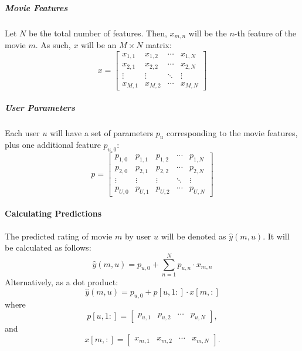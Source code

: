 \documentclass[a3paper,12pt]{article}
\begin{document}
\subparagraph{Movie Features}
Let \( N \) be the total number of features. Then, \( x_{m,n} \) will be the \( n \)-th feature of the movie \( m \). As such, \( x \) will be an \( M \times N \) matrix:
\begin{equation}
x =
\begin{bmatrix}
x_{1,1} & x_{1,2} & \cdots & x_{1,N} \\
x_{2,1} & x_{2,2} & \cdots & x_{2,N} \\
\vdots & \vdots & \ddots & \vdots \\
x_{M,1} & x_{M,2} & \cdots & x_{M,N}
\end{bmatrix} \tag{5}
\end{equation}

\subparagraph{User Parameters}
Each user \( u \) will have a set of parameters \( p_u \) corresponding to the movie features, plus one additional feature \( p_{u,0} \):
\begin{equation}
p =
\begin{bmatrix}
p_{1,0} & p_{1,1} & p_{1,2} & \cdots & p_{1,N} \\
p_{2,0} & p_{2,1} & p_{2,2} & \cdots & p_{2,N} \\
\vdots & \vdots & \vdots & \ddots & \vdots \\
p_{U,0} & p_{U,1} & p_{U,2} & \cdots & p_{U,N}
\end{bmatrix} \tag{6}
\end{equation}

\paragraph{Calculating Predictions}
The predicted rating of movie \( m \) by user \( u \) will be denoted as \( \hat{y}(m,u) \). It will be calculated as follows:
\begin{equation}
\hat{y}(m,u) = p_{u,0} + \sum_{n=1}^N p_{u,n} \cdot x_{m,n} \tag{7}
\end{equation}
Alternatively, as a dot product:
\begin{equation}
\hat{y}(m,u) = p_{u,0} + p[u,1:] \cdot x[m,:] \tag{8}
\end{equation}
where
\begin{equation}
p[u,1:] = \begin{bmatrix}
p_{u,1} & p_{u,2} & \cdots & p_{u,N}
\end{bmatrix}, \tag{9}
\end{equation}
and
\begin{equation}
x[m,:] = \begin{bmatrix}
x_{m,1} & x_{m,2} & \cdots & x_{m,N}
\end{bmatrix}. \tag{10}
\end{equation}
\end{document}
